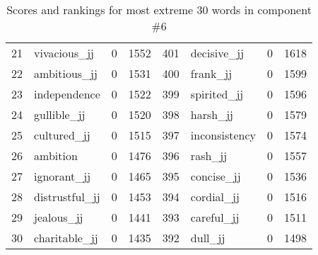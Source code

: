 \begin{table}[tbp]
\begin{tabular}{| rlr@{.}l | rlr@{.}l |}
    21 & vivacious\_jj & 0 & 1552    &    401 & decisive\_jj & 0 & 1618 \\
    22 & ambitious\_jj & 0 & 1531    &    400 & frank\_jj & 0 & 1599 \\
    23 & independence & 0 & 1522    &    399 & spirited\_jj & 0 & 1596 \\
    24 & gullible\_jj & 0 & 1520    &    398 & harsh\_jj & 0 & 1579 \\
    25 & cultured\_jj & 0 & 1515    &    397 & inconsistency & 0 & 1574 \\
    26 & ambition & 0 & 1476    &    396 & rash\_jj & 0 & 1557 \\
    27 & ignorant\_jj & 0 & 1465    &    395 & concise\_jj & 0 & 1536 \\
    28 & distrustful\_jj & 0 & 1453    &    394 & cordial\_jj & 0 & 1516 \\
    29 & jealous\_jj & 0 & 1441    &    393 & careful\_jj & 0 & 1511 \\
    30 & charitable\_jj & 0 & 1435    &    392 & dull\_jj & 0 & 1498 \\
    \hline
    \end{tabular}
    \caption{Scores and rankings for most extreme 30 words in component \#6} 
\end{table}
\clearpage
